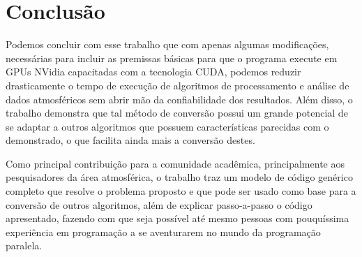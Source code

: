 \chapter*{Conclusão}

Podemos concluir com esse trabalho que com apenas algumas modificações, necessárias para incluir as premissas básicas para que o programa execute em GPUs NVidia capacitadas com a tecnologia CUDA, podemos reduzir drasticamente o tempo de execução de algoritmos de processamento e análise de dados atmosféricos sem abrir mão da confiabilidade dos resultados. Além disso, o trabalho demonstra que tal método de conversão possui um grande potencial de se adaptar a outros algoritmos que possuem características parecidas com o demonstrado, o que facilita ainda mais a conversão destes.

Como principal contribuição para a comunidade acadêmica, principalmente aos pesquisadores da área atmosférica, o trabalho traz um modelo de código genérico completo que resolve o problema proposto e que pode ser usado como base para a conversão de outros algoritmos, além de explicar passo-a-passo o código apresentado, fazendo com que seja possível até mesmo pessoas com pouquíssima experiência em programação a se aventurarem no mundo da programação paralela.